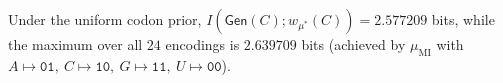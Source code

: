 Under the uniform codon prior, $I(\mathsf{Gen}(C);w_{\mu^\ast}(C))=2.577209$ bits, while the maximum over all $24$ encodings is $2.639709$ bits (achieved by $\mu_\mathrm{MI}$ with $A\mapsto \texttt{01},\ C\mapsto \texttt{10},\ G\mapsto \texttt{11},\ U\mapsto \texttt{00}$).
